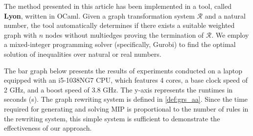 The method presented in this article has been implemented in a tool, called \textbf{Lyon}, written in OCaml. Given a graph transformation system $\mathcal{R}$ and a natural number, the tool automatically determines if there exists a suitable weighted graph with $n$ nodes without multiedges proving the termination of $\mathcal{R}$. We employ a mixed-integer programming solver (specifically, Gurobi) to find the optimal solution of inequalities over natural or real numbers.

The bar graph below presents the results of experiments conducted on a laptop equipped with an i5-1038NG7 CPU, which features 4 cores, a base clock speed of 2 GHz, and a boost speed of 3.8 GHz. The y-axis represents the runtimes in seconds (s). The graph rewriting system is defined in \autoref{def:grs_aa}. Since the time required for generating and solving MIP is proportional to the number of rules in the rewriting system, this simple system is sufficient to demonstrate the effectiveness of our approach.


